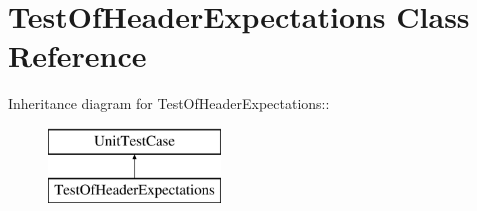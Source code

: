 \hypertarget{class_test_of_header_expectations}{
\section{TestOfHeaderExpectations Class Reference}
\label{class_test_of_header_expectations}
}
Inheritance diagram for TestOfHeaderExpectations::\begin{figure}[H]
\begin{center}
\leavevmode
\includegraphics[height=2cm]{class_test_of_header_expectations}
\end{center}
\end{figure}
